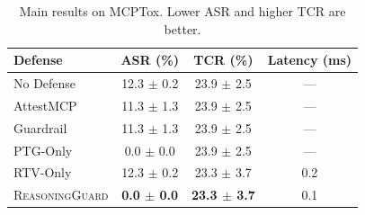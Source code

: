 \begin{table}[t]
\centering
\small
\begin{tabular}{lccc}
\toprule
Defense & ASR (\%) & TCR (\%) & Latency (ms) \\
\midrule
No Defense & 12.3 $\pm$ 0.2 & 23.9 $\pm$ 2.5 & --- \\
AttestMCP & 11.3 $\pm$ 1.3 & 23.9 $\pm$ 2.5 & --- \\
Guardrail & 11.3 $\pm$ 1.3 & 23.9 $\pm$ 2.5 & --- \\
PTG-Only & 0.0 $\pm$ 0.0 & 23.9 $\pm$ 2.5 & --- \\
RTV-Only & 12.3 $\pm$ 0.2 & 23.3 $\pm$ 3.7 & 0.2 \\
\textsc{ReasoningGuard} & \textbf{0.0 $\pm$ 0.0} & \textbf{23.3 $\pm$ 3.7} & 0.1 \\
\bottomrule
\end{tabular}
\caption{Main results on MCPTox. Lower ASR and higher TCR are better.}
\label{tab:main}
\end{table}
